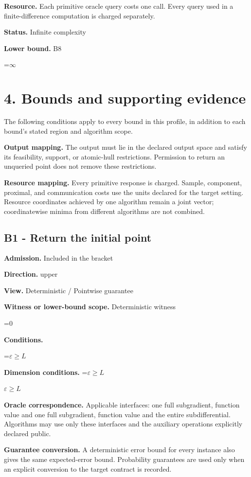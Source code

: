 \documentclass[10pt,a4paper]{article}
\newcommand{\AtlasMath}[1]{\par\begingroup\centering\setbox0=\hbox{$\displaystyle #1$}\ifdim\wd0>1.4\linewidth\typeout{ATLAS WIDE FORMULA: \the\wd0}\fi\ifdim\wd0>\linewidth\resizebox{\linewidth}{!}{\box0}\else\box0\fi\par\endgroup}
\newcommand{\AtlasInlineMath}[1]{\begingroup\setbox0=\hbox{$#1$}\ifdim\wd0>.4\linewidth\endgroup\AtlasMath{#1}\else\endgroup$#1$\fi}
\begin{document}
\textbf{Resource.} Each primitive oracle query costs one call. Every query used in a finite-difference computation is charged separately.

\textbf{Status.} Infinite complexity

\textbf{Lower bound.} B8

\AtlasMath{\infty}
\section{4. Bounds and supporting evidence}
The following conditions apply to every bound in this profile, in addition to each bound's stated region and algorithm scope.

\textbf{Output mapping.} The output must lie in the declared output space and satisfy its feasibility, support, or atomic-hull restrictions. Permission to return an unqueried point does not remove these restrictions.

\textbf{Resource mapping.} Every primitive response is charged. Sample, component, proximal, and communication costs use the units declared for the target setting. Resource coordinates achieved by one algorithm remain a joint vector; coordinatewise minima from different algorithms are not combined.

\subsection{B1 - Return the initial point}
\textbf{Admission.} Included in the bracket

\textbf{Direction.} upper

\textbf{View.} Deterministic / Pointwise guarantee

\textbf{Witness or lower-bound scope.} Deterministic witness

\AtlasMath{0}
\textbf{Conditions.} 
\AtlasMath{\varepsilon\ge L}


\textbf{Dimension conditions.} \AtlasInlineMath{\varepsilon\ge L}

\textbf{Oracle correspondence.} Applicable interfaces: one full subgradient, function value and one full subgradient, function value and the entire subdifferential. Algorithms may use only these interfaces and the auxiliary operations explicitly declared public.

\textbf{Guarantee conversion.} A deterministic error bound for every instance also gives the same expected-error bound. Probability guarantees are used only when an explicit conversion to the target contract is recorded.
\end{document}
